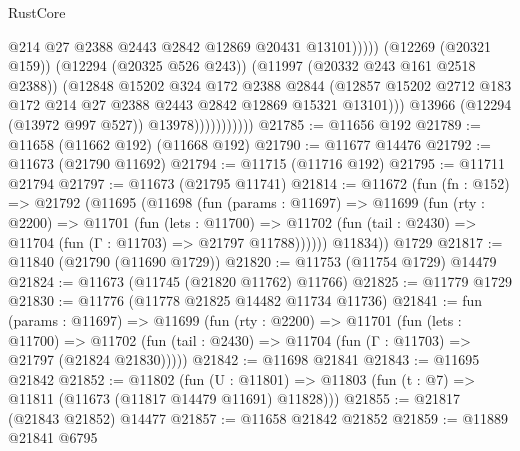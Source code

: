 \begin{lexlean}{RustCore}
\begin{coremodule}
                                      @214
                                      @27
                                      @2388
                                      @2443
                                      @2842
                                      @12869
                                      @20431
                                      @13101)))))
                            (@12269 (@20321 @159))
                            (@12294 (@20325 @526 @243))
                            (@11997 (@20332 @243 @161 @2518 @2388))
                            (@12848
                              @15202
                              @324
                              @172
                              @2388
                              @2844
                              (@12857
                                @15202
                                @2712
                                @183
                                @172
                                @214
                                @27
                                @2388
                                @2443
                                @2842
                                @12869
                                @15321
                                @13101)))
                          @13966
                          (@12294 (@13972 @997 @527))
                          @13978)))))))))))
@21785 := @11656 @192
@21789 := @11658 (@11662 @192) (@11668 @192)
@21790 := @11677 @14476
@21792 := @11673 (@21790 @11692)
@21794 := @11715 (@11716 @192)
@21795 := @11711 @21794
@21797 := @11673 (@21795 @11741)
@21814 := @11672
    (fun (fn : @152) =>
    @21792
      (@11695
        (@11698
          (fun (params : @11697) =>
          @11699
            (fun (rty : @2200) =>
            @11701
              (fun (lets : @11700) =>
              @11702 (fun (tail : @2430) => @11704 (fun (Γ : @11703) => @21797 @11788))))))
        @11834))
    @1729
@21817 := @11840 (@21790 (@11690 @1729))
@21820 := @11753 (@11754 @1729) @14479
@21824 := @11673 (@11745 (@21820 @11762) @11766)
@21825 := @11779 @1729
@21830 := @11776 (@11778 @21825 @14482 @11734 @11736)
@21841 := fun (params : @11697) =>
  @11699
    (fun (rty : @2200) =>
    @11701
      (fun (lets : @11700) =>
      @11702 (fun (tail : @2430) => @11704 (fun (Γ : @11703) => @21797 (@21824 @21830)))))
@21842 := @11698 @21841
@21843 := @11695 @21842
@21852 := @11802
    (fun (U : @11801) => @11803 (fun (t : @7) => @11811 (@11673 (@11817 @14479 @11691) @11828)))
@21855 := @21817 (@21843 @21852) @14477
@21857 := @11658 @21842 @21852
@21859 := @11889 @21841 @6795

\end{coremodule}
\end{lexlean}
